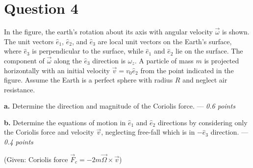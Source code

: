 \documentclass[a4paper,12pt]{article}
\begin{document}
\section*{Question 4}
\begin{figure}
\end{figure}
In the figure, the earth's rotation about its axis with angular velocity $\vec{\omega}$ is shown. The unit vectors $\hat{e}_1$, $\hat{e}_2$, and $\hat{e}_3$ are local unit vectors on the Earth's surface, where $\hat{e}_3$ is perpendicular to the surface, while $\hat{e}_1$ and $\hat{e}_2$ lie on the surface. The component of $\vec{\omega}$ along the $\hat{e}_3$ direction is $\omega_z$. A particle of mass $m$ is projected horizontally with an initial velocity $\vec{v}=v_0\hat{e}_2$ from the point indicated in the figure. Assume the Earth is a perfect sphere with radius $R$ and neglect air resistance.

\textbf{a.} Determine the direction and magnitude of the Coriolis force. --- \textit{0.6 points}

\textbf{b.} Determine the equations of motion in $\hat{e}_1$ and $\hat{e}_2$ directions by considering only the Coriolis force and velocity $\vec{v}$, neglecting free-fall which is in $-\hat{e}_3$ direction. --- \textit{0.4 points}

(Given: Coriolis force $\vec{F}_c = -2m \vec{\Omega} \times \vec{v}$)
\end{document}
